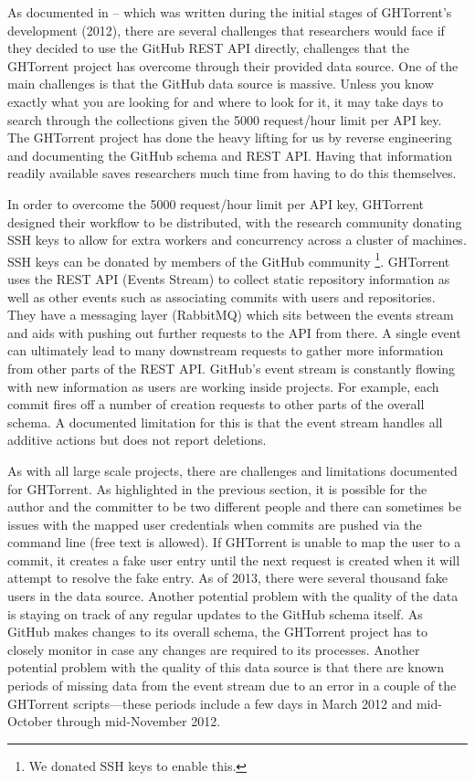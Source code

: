 As documented in \cite{gousios_ghtorrent:_2012} – which was written during the initial stages of GHTorrent's development (2012), there are several challenges that researchers would face if they decided to use the GitHub REST API directly, challenges that the GHTorrent project has overcome through their provided data source. One of the main challenges is that the GitHub data source is massive. Unless you know exactly what you are looking for and where to look for it, it may take days to search through the collections given the 5000 request/hour limit per API key. The GHTorrent project has done the heavy lifting for us by reverse engineering and documenting the GitHub schema and REST API. Having that information readily available saves researchers much time from having to do this themselves.

In order to overcome the 5000 request/hour limit per API key, GHTorrent designed their workflow to be distributed, with the research community donating SSH keys to allow for extra workers and concurrency across a cluster of machines. SSH keys can be donated by members of the GitHub community \footnote{We donated SSH keys to enable this.}.  GHTorrent uses the REST API \cite{_github_????} (Events Stream) to collect static repository information as well as other events such as associating commits with users and repositories. They have a messaging layer (RabbitMQ) which sits between the events stream and aids with pushing out further requests to the API from there. A single event can ultimately lead to many downstream requests to gather more information from other parts of the REST API. GitHub's event stream is constantly flowing with new information as users are working inside projects. For example, each commit fires off a number of creation requests to other parts of the overall schema. A documented limitation for this is that the event stream handles all additive actions but does not report deletions.  \cite{gousios_ghtorent_2013}

As with all large scale projects, there are challenges and limitations documented for GHTorrent. As highlighted in the previous section, it is possible for the author and the committer to be two different people and there can sometimes be issues with the mapped user credentials when commits are pushed via the command line (free text is allowed). If GHTorrent is unable to map the user to a commit, it creates a fake user entry until the next request is created when it will attempt to resolve the fake entry. As of 2013, there were several thousand fake users in the data source. Another potential problem with the quality of the data is staying on track of any regular updates to the GitHub schema itself. As GitHub makes changes to its overall schema, the GHTorrent project has to closely monitor in case any changes are required to its processes. Another potential problem with the quality of this data source is that there are known periods of missing data from the event stream due to an error in a couple of the GHTorrent scripts---these periods include a few days in March 2012 and mid-October through mid-November 2012. \cite{gousios_ghtorent_2013} 